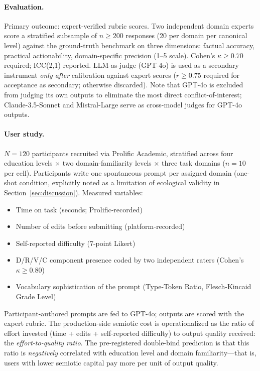 \documentclass[12pt,a4paper]{article}
\begin{document}
\paragraph{Evaluation.} Primary outcome: expert-verified rubric scores.
Two independent domain experts score a stratified subsample of $n \geq 200$
responses (20 per domain per canonical level) against the ground-truth
benchmark on three dimensions: factual accuracy, practical actionability,
domain-specific precision (1--5 scale). Cohen's $\kappa \geq 0.70$ required;
ICC(2,1) reported. LLM-as-judge (GPT-4o) is used as a secondary instrument
\emph{only after} calibration against expert scores ($r \geq 0.75$ required
for acceptance as secondary; otherwise discarded). Note that GPT-4o is
excluded from judging its own outputs to eliminate the most direct
conflict-of-interest; Claude-3.5-Sonnet and Mistral-Large serve as
cross-model judges for GPT-4o outputs.

\paragraph{User study.} $N = 120$ participants recruited via Prolific
Academic, stratified across four education levels $\times$ two domain-familiarity
levels $\times$ three task domains ($n = 10$ per cell). Participants write
one spontaneous prompt per assigned domain (one-shot condition, explicitly
noted as a limitation of ecological validity in Section~\ref{sec:discussion}).
Measured variables:
\begin{itemize}
\item Time on task (seconds; Prolific-recorded)
\item Number of edits before submitting (platform-recorded)
\item Self-reported difficulty (7-point Likert)
\item D/R/V/C component presence coded by two independent raters
      (Cohen's $\kappa \geq 0.80$)
\item Vocabulary sophistication of the prompt (Type-Token Ratio,
      Flesch-Kincaid Grade Level)
\end{itemize}

Participant-authored prompts are fed to GPT-4o; outputs are scored with
the expert rubric. The production-side semiotic cost is operationalized as
the ratio of effort invested (time + edits + self-reported difficulty) to
output quality received: the \emph{effort-to-quality ratio}. The pre-registered
double-bind prediction is that this ratio is \emph{negatively} correlated
with education level and domain familiarity---that is, users with lower
semiotic capital pay more per unit of output quality.
\end{document}
